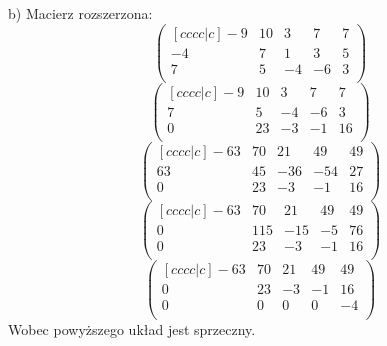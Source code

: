 \documentclass{article}
\begin{document}
b)
Macierz rozszerzona:
$$
\begin{pmatrix}[cccc|c]
-9 & 10 & 3 & 7 & 7 \\
-4 & 7 & 1 & 3 & 5 \\
7 & 5 & -4 & -6 & 3 \\
\end{pmatrix}
$$
$$
\begin{pmatrix}[cccc|c]
-9 & 10 & 3 & 7 & 7 \\
7 & 5 & -4 & -6 & 3 \\
0 & 23 & -3 & -1 & 16 \\
\end{pmatrix}
$$
$$
\begin{pmatrix}[cccc|c]
-63 & 70 & 21 & 49 & 49 \\
63 & 45 & -36 & -54 & 27 \\
0 & 23 & -3 & -1 & 16 \\
\end{pmatrix}
$$
$$
\begin{pmatrix}[cccc|c]
-63 & 70 & 21 & 49 & 49 \\
0 & 115 & -15 & -5 & 76 \\
0 & 23 & -3 & -1 & 16 \\
\end{pmatrix}
$$
$$
\begin{pmatrix}[cccc|c]
-63 & 70 & 21 & 49 & 49 \\
0 & 23 & -3 & -1 & 16 \\
0 & 0 & 0 & 0 & -4 \\
\end{pmatrix}
$$
Wobec powyższego układ jest sprzeczny.
\end{document}
